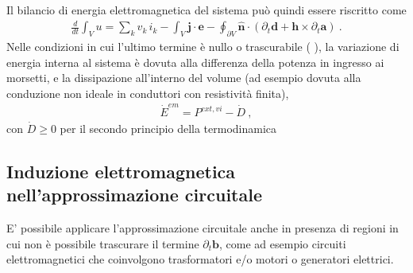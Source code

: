 \documentclass[letterpaper,10pt,english]{jupyterBook}
\begin{document}
\sphinxAtStartPar
Il bilancio di energia elettromagnetica del sistema può quindi essere riscritto come
\begin{equation*}
\begin{split}\frac{d}{dt} \int_V u = \sum_k v_k \, i_k - \int_{V} \mathbf{j} \cdot \mathbf{e} - \oint_{\partial V} \hat{\mathbf{n}} \cdot \left( \partial_t \mathbf{d} + \mathbf{h} \times \partial_t \mathbf{a} \right) \ .\end{split}
\end{equation*}
\sphinxAtStartPar
Nelle condizioni in cui l’ultimo termine è nullo o trascurabile ( ), la variazione di energia interna al sistema è dovuta alla differenza della potenza in ingresso ai morsetti, e la dissipazione all’interno del volume (ad esempio dovuta alla conduzione non ideale in conduttori con resistività finita),
\begin{equation*}
\begin{split}\dot{E}^{em} = P^{ext, vi} - \dot{D} \ ,\end{split}
\end{equation*}
\sphinxAtStartPar
con \(\dot{D} \ge 0\) per il secondo principio della termodinamica  

\sphinxstepscope




\subsection{Induzione elettromagnetica nell’approssimazione circuitale}
\label{\detokenize{ch/circuits-electric-induction:induzione-elettromagnetica-nell-approssimazione-circuitale}}\label{\detokenize{ch/circuits-electric-induction:classical-electromagnetism-circuits-electric-induction}}\label{\detokenize{ch/circuits-electric-induction::doc}}
\sphinxAtStartPar
E’ possibile applicare l’approssimazione circuitale anche in presenza di regioni in cui non è possibile trascurare il termine \(\partial_t \mathbf{b}\), come ad esempio circuiti elettromagnetici che coinvolgono trasformatori e/o motori o generatori elettrici.
\end{document}
